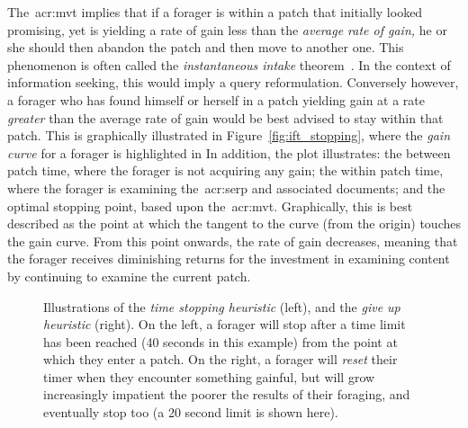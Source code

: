 The~\gls{acr:mvt} implies that if a forager is within a patch that initially looked promising, yet is yielding a rate of gain less than the \emph{average rate of gain,} he or she should then abandon the patch and then move to another one. This phenomenon is often called the \emph{instantaneous intake} theorem~\citep{stephens1986foraging_theory}. In the context of information seeking, this would imply a query reformulation. Conversely however, a forager who has found himself or herself in a patch yielding gain at a rate \emph{greater} than the average rate of gain would be best advised to stay within that patch. This is graphically illustrated in Figure~\ref{fig:ift_stopping}, where the \emph{gain curve} for a forager is highlighted in  In addition, the plot illustrates:  the between patch time, where the forager is not acquiring any gain;  the within patch time, where the forager is examining the~\gls{acr:serp} and associated documents; and  the optimal stopping point, based upon the~\gls{acr:mvt}. Graphically, this is best described as the point at which the tangent to the curve (from the origin) touches the gain curve. From this point onwards, the rate of gain decreases, meaning that the forager receives diminishing returns for the investment in examining content by continuing to examine the current patch.

\begin{figure}[t!]
    \centering
    \caption[Time-based stopping heuristics]{Illustrations of the \emph{time stopping heuristic} (left), and the \emph{give up heuristic} (right). On the left, a forager will stop after a time limit has been reached (40 seconds in this example) from the point at which they enter a patch. On the right, a forager will \emph{reset} their timer when they encounter something gainful, but will grow increasingly impatient the poorer the results of their foraging, and eventually stop too (a 20 second limit is shown here).}
    \label{fig:gut}
\end{figure}

